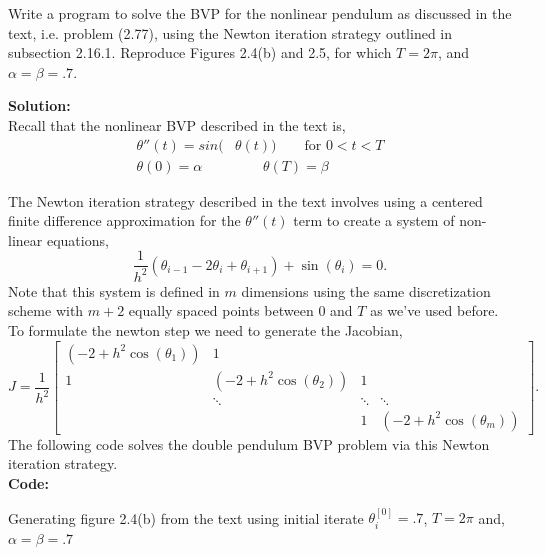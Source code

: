 \documentclass[12pt]{article}
\makeatletter
\theoremstyle{homework}
\newenvironment{exercise}[1]
{\def\@currentlabel{#1}\exercisecore}
{\endexercisecore}
\newcommand{\localhead}[1]{\par\smallskip\noindent\textbf{#1}\nobreak\\}%
\newcommand\solution{\localhead{Solution:}}
\makeatother
\begin{document}
\vspace{1in}



\begin{exercise}{Problem P19} Write a program to solve the BVP for the nonlinear pendulum as discussed in 
  the text, i.e. problem (2.77), using the Newton iteration strategy outlined in subsection 2.16.1. Reproduce Figures 2.4(b)
  and 2.5, for which $T = 2\pi$, and $\alpha = \beta = .7$.


  \solution Recall that the nonlinear BVP described in the text is, 
  \begin{align*}
    \theta''(t) = sin(&\theta(t)) \qquad \text{for } 0 < t < T\\
    \theta(0) = \alpha &\qquad \theta(T) = \beta 
  \end{align*}

  The Newton iteration strategy described in the text involves using a centered finite difference approximation for the $\theta''(t)$
  term to create a system of non-linear equations, 
  \begin{equation*}
    \frac{1}{h^2}(\theta_{i - 1} - 2\theta_i + \theta_{i + 1}) + \sin(\theta_i) = 0.
  \end{equation*}
  Note that this system is defined in $m$ dimensions using the same discretization scheme with $m+2$ equally spaced points between 0 and $T$ as we've used before. 
  To formulate the newton step we need to generate the Jacobian,    
  \begin{equation*}
    J = \frac{1}{h^2}
    \begin{bmatrix}
         (-2 + h^2\cos(\theta_1)) &    1    &         &             \\ 
               1 & (-2 + h^2\cos(\theta_2)) &    1    &              \\ 
                          &  \ddots &  \ddots & \ddots        \\
                                   &         &    1    & (-2 + h^2\cos(\theta_m)) 
    \end{bmatrix}.
  \end{equation*}
  The following code solves the double pendulum BVP problem via this Newton iteration strategy.\\ 
  
  \textbf{Code:}
  \begin{center}
    
  \end{center}
Generating figure 2.4(b) from the text using initial iterate $\theta_i^{[0]} = .7$, $T = 2\pi$ and,  $\alpha = \beta = .7$


\end{exercise}
\end{document}
